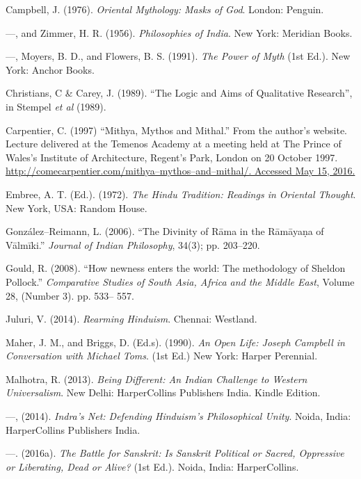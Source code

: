 \begin{thebibliography}{99}
 Campbell, J. (1976). \textit{Oriental Mythology: Masks of God}. London: Penguin.

  —, and Zimmer, H. R. (1956). \textit{Philosophies of India}. New York: Meridian Books.

  —, Moyers, B. D., and Flowers, B. S. (1991). \textit{The Power of Myth} (1st Ed.). New York: Anchor Books.

  Christians, C \& Carey, J. (1989). “The Logic and Aims of Qualitative Research”, in Stempel \textit{et al} (1989).

  Carpentier, C. (1997) “Mithya, Mythos and Mithal.” From the author’s website. Lecture delivered at the Temenos Academy at a meeting held at The Prince of Wales's Institute of Architecture, Regent's Park, London on 20 October 1997. \url{http://comecarpentier.com/mithya–mythos–and–mithal/. Accessed May 15, 2016.}

  Embree, A. T. (Ed.). (1972). \textit{The Hindu Tradition: Readings in Oriental Thought}. New York, USA: Random House.

  González–Reimann, L. (2006). “The Divinity of Rāma in the Rāmāyaṇa of Vālmīki.” \textit{Journal of Indian Philosophy}, 34(3); pp. 203–220.

  Gould, R. (2008). “How newness enters the world: The methodology of Sheldon Pollock.” \textit{Comparative Studies of South Asia, Africa and the Middle East}, Volume 28, (Number 3). pp. 533– 557.

  Juluri, V. (2014). \textit{Rearming Hinduism}. Chennai: Westland.

  Maher, J. M., and Briggs, D. (Ed.s). (1990). \textit{An Open Life: Joseph Campbell in Conversation with Michael Toms}. (1st Ed.) New York: Harper Perennial.

  Malhotra, R. (2013). \textit{Being Different: An Indian Challenge to Western Universalism}. New Delhi: HarperCollins Publishers India. Kindle Edition.

  —, (2014). \textit{Indra’s Net: Defending Hinduism’s Philosophical Unity}. Noida, India: HarperCollins Publishers India.

  —. (2016a). \textit{The Battle for Sanskrit: Is Sanskrit Political or Sacred, Oppressive or Liberating, Dead or Alive?} (1st Ed.). Noida, India: HarperCollins.


\end{thebibliography}
